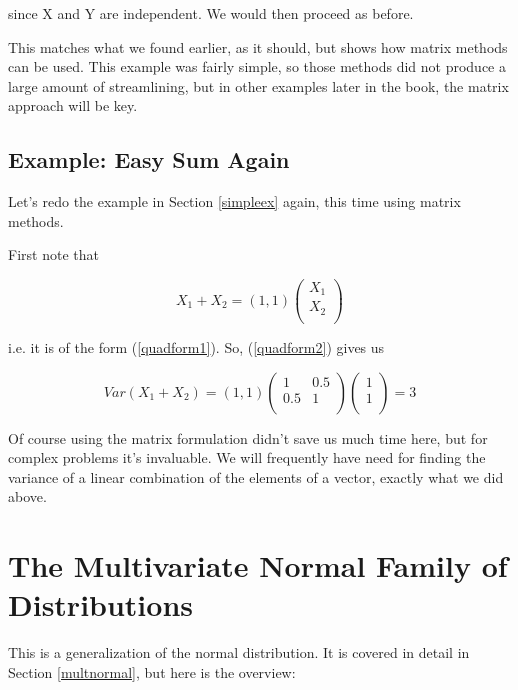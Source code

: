 since X and Y are independent.  We would then proceed as before.

This matches what we found earlier, as it should, but shows how matrix
methods can be used.  This example was fairly simple, so those methods
did not produce a large amount of streamlining, but in other examples
later in the book, the matrix approach will be key.

\subsection{Example:  Easy Sum Again}

Let's redo the example in Section \ref{simpleex} again, this time using
matrix methods.

First note that

\begin{equation}
X_1 + X_2 = (1,1) 
\left (
\begin{array}{r}
X_1 \\
X_2 \\
\end{array}
\right )
\end{equation}

i.e. it is of the form (\ref{quadform1}).  So, (\ref{quadform2}) gives
us

\begin{equation}
\label{easyvar}
Var(X_1 + X_2) =
(1,1)
\left (
\begin{array}{rr}
1 & 0.5 \\
0.5 & 1 \\
\end{array}
\right )
\left (
\begin{array}{r}
1 \\
1 \\
\end{array}
\right )
= 3
\end{equation}

Of course using the matrix formulation didn't save us much time here,
but for complex problems it's invaluable.  We will frequently have need
for finding the variance of a linear combination of the elements of a
vector, exactly what we did above.

\section{The Multivariate Normal Family of Distributions}
\label{multnorm}

This is a generalization of the normal distribution.  It is covered in
detail in Section \ref{multnormal}, but here is the overview:

